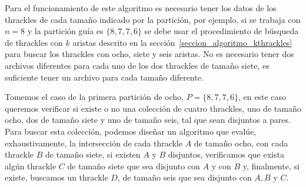   \begin{algorithm}
    \LinesNumbered
    \setcounter{AlgoLine}{35}
  \end{algorithm}

  Para el funcionamiento de este algoritmo es necesario tener los datos de los thrackles de cada
  tamaño indicado por la partición, por ejemplo, si se trabaja con $n=8$ y la partición guía es
  $\{8,7,7,6\}$ se debe usar el procedimiento de búsqueda de thrackles con $k$ aristas descrito en
  la sección~\ref{seccion_algoritmo_kthrackles} para buscar los thrackles con ocho, siete y seis
  aristas. No es necesario tener dos archivos diferentes para cada uno de los dos thrackles de
  tamaño siete, es suficiente tener un archivo para cada tamaño diferente.

  Tomemos el caso de la primera partición de ocho, $P=\{8,7,7,6\}$, en este caso queremos
  verificar si existe o no una colección de cuatro thrackles, uno de tamaño ocho, dos de
  tamaño siete y uno de tamaño seis, tal que sean disjuntos a pares. Para buscar esta colección,
  podemos diseñar un algoritmo que evalúe, exhaustivamente, la intersección de cada
  thrackle $A$ de tamaño ocho, con cada thrackle $B$ de tamaño siete, si existen $A$ y $B$
  disjuntos, verificamos que exista algún thrackle $C$ de tamaño siete que sea disjunto con
  $A$ y con $B$ y, finalmente, si existe, buscamos un thrackle $D$, de tamaño seis que sea
  disjunto con $A,B$ y $C$.

